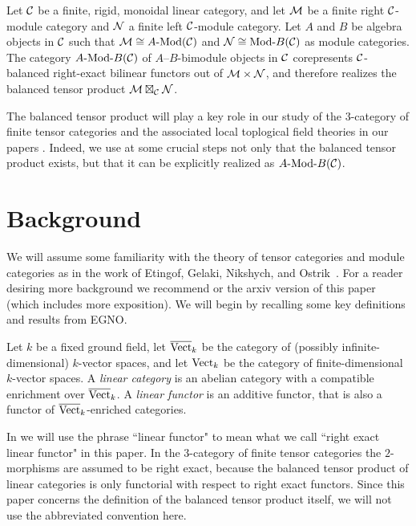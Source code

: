 \documentclass{amsart}
\begin{document}
\begin{theorem*}
Let $\mathcal C$ be a finite, rigid, monoidal linear category, and let $\mathcal M$ be a finite right $\mathcal C$-module category and $\mathcal N$ a finite left $\mathcal C$-module category.  Let $A$ and $B$ be algebra objects in $\mathcal C$ such that $\cM \cong \Mod{A}{}(\cC)$ and $\cN \cong \Mod{}{B}(\cC)$ as module categories.  The category $\Mod{A}{B}(\cC)$ of $A$--$B$-bimodule objects in $\mathcal C$ corepresents $\mathcal C$-balanced right-exact bilinear functors out of $\mathcal M \times \mathcal N$, and therefore realizes the balanced tensor product $\mathcal M \boxtimes_\mathcal C \mathcal N$.
\end{theorem*}

The balanced tensor product will play a key role in our study of the $3$-category of finite tensor categories and the associated local toplogical field theories in our papers \cite{3TC, DTCI}.  Indeed, we use at some crucial steps not only that the balanced tensor product exists, but that it can be explicitly realized as $\Mod{A}{B}(\cC)$.  

\section{Background}

We will assume some familiarity with the theory of tensor categories and module categories as in the work of Etingof, Gelaki, Nikshych, and Ostrik~\cite{EGNO, EO-ftc, MR2183279, MR2097289,0909.3140}.  For a reader desiring more background we recommend \cite{EGNO} or the arxiv version of this paper (which includes more exposition).  We will begin by recalling some key definitions and results from EGNO.

	Let $k$ be a fixed ground field, let $\overline{\mathrm{Vect}}_k$ be the category of (possibly infinite-dimensional) $k$-vector spaces, and let $\mathrm{Vect}_k$ be the category of finite-dimensional $k$-vector spaces.   A {\em linear category} is an abelian category with a compatible enrichment over $\overline{\mathrm{Vect}}_k$. 
A {\em linear functor} is an additive functor, that is also a functor of $\overline{\mathrm{Vect}}_k$-enriched categories. 

\begin{warning}
	In \cite{3TC, DTCI} we will use the phrase ``linear functor" to mean what we call ``right exact linear functor" in this paper.  In the $3$-category of finite tensor categories the $2$-morphisms are assumed to be right exact, because the balanced tensor product of linear categories is only functorial with respect to right exact functors.  Since this paper concerns the definition of the balanced tensor product itself, we will not use the abbreviated convention here.
\end{warning}
\end{document}
